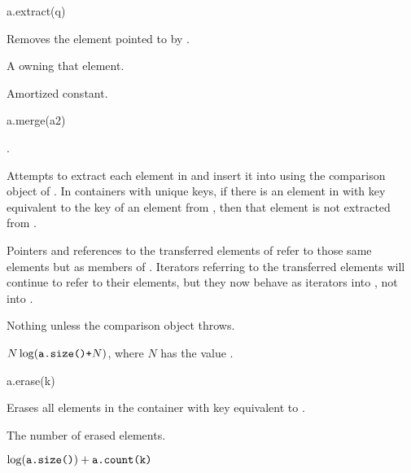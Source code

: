 %
\begin{itemdecl}
a.extract(q)
\end{itemdecl}

\begin{itemdescr}
\pnum
\result
{}

\pnum
\effects
Removes the element pointed to by .

\pnum
\returns
A  owning that element.

\pnum
\complexity
Amortized constant.
\end{itemdescr}

%
\begin{itemdecl}
a.merge(a2)
\end{itemdecl}

\begin{itemdescr}
\pnum
\result
{}

\pnum
\expects
{}.

\pnum
\effects
Attempts to extract each element in  and insert it into 
using the comparison object of .
In containers with unique keys,
if there is an element in  with key equivalent to
the key of an element from ,
then that element is not extracted from .

\pnum
\ensures
Pointers and references to the transferred elements of 
refer to those same elements but as members of .
Iterators referring to the transferred elements
will continue to refer to their elements,
but they now behave as iterators into , not into .

\pnum
\throws
Nothing unless the comparison object throws.

\pnum
\complexity
$N \log(\texttt{a.size()+} N)$, where $N$ has the value .
\end{itemdescr}

%
\begin{itemdecl}
a.erase(k)
\end{itemdecl}

\begin{itemdescr}
\pnum
\result
{}

\pnum
\effects
Erases all elements in the container with key equivalent to .

\pnum
\returns
The number of erased elements.

\pnum
\complexity
$\log (\texttt{a.size()}) + \texttt{a.count(k)}$
\end{itemdescr}

